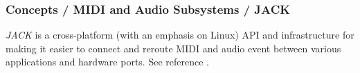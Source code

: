 \subsubsection{Concepts / MIDI and Audio Subsystems / JACK}
\label{subsubsec:concepts_midi_audio_jack}

   \textsl{JACK} is a cross-platform (with an emphasis on Linux)
   API and infrastructure for making it easier to connect and reroute MIDI
   and audio event between various applications and hardware ports.
   See reference \cite{jack}.


